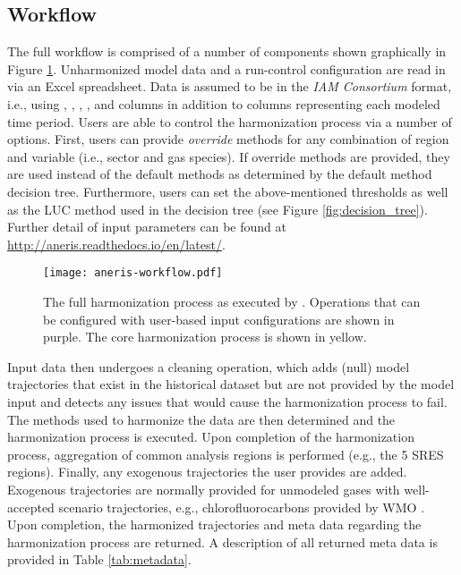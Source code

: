 \subsection{ Workflow}

The full  workflow is comprised of a number of components shown
graphically in Figure \ref{fig:workflow}. Unharmonized model data and a
run-control configuration are read in via an Excel spreadsheet. Data is assumed
to be in the \textit{IAM Consortium} format, i.e., using ,
, , , and  columns in
addition to columns representing each modeled time period. Users are able to
control the harmonization process via a number of options. First, users can
provide \textit{override} methods for any combination of region and variable
(i.e., sector and gas species). If override methods are provided, they are used
instead of the default methods as determined by the default method decision
tree. Furthermore, users can set the above-mentioned thresholds as well as the
LUC method used in the decision tree (see Figure
\ref{fig:decision_tree}). Further detail of input parameters can be found at
\hyperlink{http://aneris.readthedocs.io/en/latest/}{http://aneris.readthedocs.io/en/latest/}.

\begin{figure}
  \begin{center}
    \texttt{[image: aneris-workflow.pdf]}
    \caption[]{
      \label{fig:workflow}
      The full harmonization process as executed by . Operations
      that can be configured with user-based input configurations are shown in
      purple. The core harmonization process is shown in yellow.  }
  \end{center}
\end{figure}

Input data then undergoes a cleaning operation, which adds (null) model
trajectories that exist in the historical dataset but are not provided by the
model input and detects any issues that would cause the harmonization process to
fail. The methods used to harmonize the data are then determined and the
harmonization process is executed. Upon completion of the harmonization process,
aggregation of common analysis regions is performed (e.g., the 5 SRES
regions). Finally, any exogenous trajectories the user provides are
added. Exogenous trajectories are normally provided for unmodeled gases with
well-accepted scenario trajectories, e.g., chlorofluorocarbons provided by WMO
\cite{wmo2014}. Upon completion, the harmonized trajectories and meta data
regarding the harmonization process are returned. A description of all returned
meta data is provided in Table \ref{tab:metadata}.


